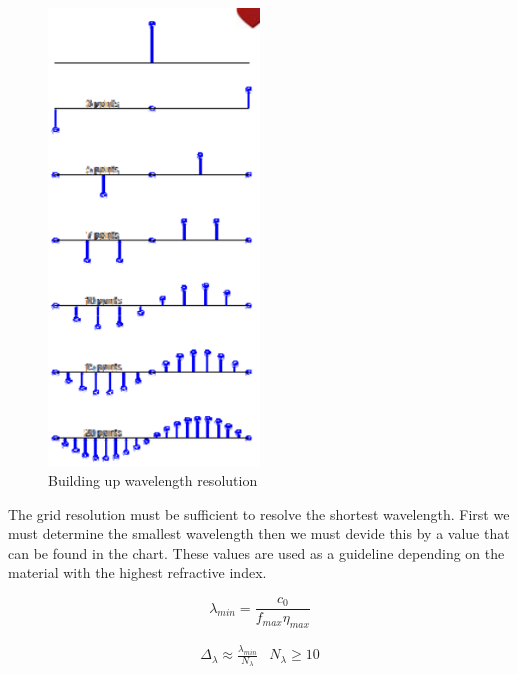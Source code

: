\documentclass[a4paper,10pt]{article}
\begin{document}
\begin{figure}[ht]
   \centering
     \includegraphics[width=0.5\textwidth]{Wavelength.png}
   \caption{Building up wavelength resolution}
\end{figure}


The grid resolution must be sufficient to resolve the shortest wavelength.  First we must determine the smallest wavelength then we must devide this by a value that can be found in the chart.  These values are used as a guideline depending on the material with the highest refractive index.

\begin{equation*}
 \lambda_{min} = \frac{c_0}{f_{max}\eta_{max}}
\end{equation*}

\begin{eqnarray*}
 \Delta_{\lambda} \approx \frac{\lambda_{min}}{N_{\lambda}} & N_{\lambda} \geq 10
\end{eqnarray*}
\end{document}
